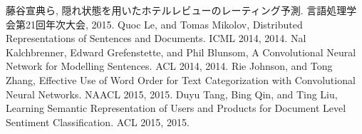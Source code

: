 \documentclass[11pt,a4paper]{ltjsarticle}
\begin{document}
\begin{thebibliography}{9}
  藤谷宣典ら,
  隠れ状態を用いたホテルレビューのレーティング予測.
  言語処理学会第21回年次大会, 2015.
  Quoc Le, and Tomas Mikolov,
  Distributed Representations of Sentences and Documents.
  ICML 2014, 2014.
  Nal Kalchbrenner, Edward Grefenstette, and Phil Blunsom,
  A Convolutional Neural Network for Modelling Sentences.
  ACL 2014, 2014.
  Rie Johnson, and Tong Zhang,
  Effective Use of Word Order for Text Categorization
  with Convolutional Neural Networks.
  NAACL 2015, 2015.
  Duyu Tang, Bing Qin, and Ting Liu,
  Learning Semantic Representation of Users and Products
  for Document Level Sentiment Classification.
  ACL 2015, 2015.
\end{thebibliography}
\end{document}
